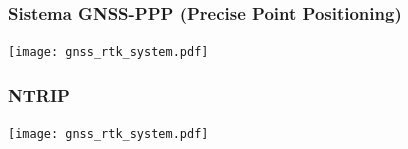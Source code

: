 \begin{frame}
    \frametitle{Sistema GNSS-PPP (Precise Point Positioning)}
    \begin{center}
        \texttt{[image: gnss\_rtk\_system.pdf]}
    \end{center}

\end{frame}

\begin{frame}
    \frametitle{NTRIP}
    \begin{center}
        \texttt{[image: gnss\_rtk\_system.pdf]}
    \end{center}

\end{frame}